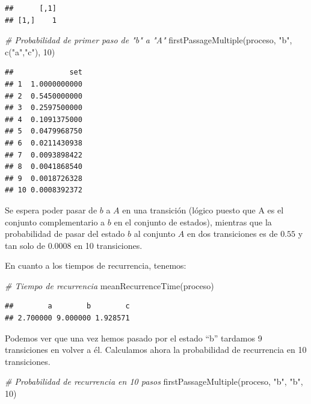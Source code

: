 \documentclass[
]{book}
\newenvironment{Shaded}{\begin{snugshade}}{\end{snugshade}}
\newcommand{\CommentTok}[1]{\textcolor[rgb]{0.56,0.35,0.01}{\textit{#1}}}
\newcommand{\DecValTok}[1]{\textcolor[rgb]{0.00,0.00,0.81}{#1}}
\newcommand{\FunctionTok}[1]{\textcolor[rgb]{0.00,0.00,0.00}{#1}}
\newcommand{\NormalTok}[1]{#1}
\newcommand{\StringTok}[1]{\textcolor[rgb]{0.31,0.60,0.02}{#1}}
\theoremstyle{definition}
\theoremstyle{definition}
\theoremstyle{definition}
\theoremstyle{definition}
\theoremstyle{remark}
\begin{document}
\begin{verbatim}
##      [,1]
## [1,]    1
\end{verbatim}

\begin{Shaded}
\begin{Highlighting}[]
\CommentTok{\# Probabilidad de primer paso de "b" a "A"}
\FunctionTok{firstPassageMultiple}\NormalTok{(proceso, }\StringTok{"b"}\NormalTok{, }\FunctionTok{c}\NormalTok{(}\StringTok{"a"}\NormalTok{,}\StringTok{"c"}\NormalTok{), }\DecValTok{10}\NormalTok{)}
\end{Highlighting}
\end{Shaded}

\begin{verbatim}
##             set
## 1  1.0000000000
## 2  0.5450000000
## 3  0.2597500000
## 4  0.1091375000
## 5  0.0479968750
## 6  0.0211430938
## 7  0.0093898422
## 8  0.0041868540
## 9  0.0018726328
## 10 0.0008392372
\end{verbatim}

Se espera poder pasar de \(b\) a \(A\) en una transición (lógico puesto que A es el conjunto complementario a \(b\) en el conjunto de estados), mientras que la probabilidad de pasar del estado \(b\) al conjunto \(A\) en dos transiciones es de \(0.55\) y tan solo de \(0.0008\) en 10 transiciones.

En cuanto a los tiempos de recurrencia, tenemos:

\begin{Shaded}
\begin{Highlighting}[]
\CommentTok{\# Tiempo de recurrencia}
\FunctionTok{meanRecurrenceTime}\NormalTok{(proceso)}
\end{Highlighting}
\end{Shaded}

\begin{verbatim}
##        a        b        c 
## 2.700000 9.000000 1.928571
\end{verbatim}

Podemos ver que una vez hemos pasado por el estado ``b'' tardamos 9 transiciones en volver a él. Calculamos ahora la probabilidad de recurrencia en 10 transiciones.

\begin{Shaded}
\begin{Highlighting}[]
\CommentTok{\# Probabilidad de recurrencia en 10 pasos}
\FunctionTok{firstPassageMultiple}\NormalTok{(proceso, }\StringTok{"b"}\NormalTok{, }\StringTok{"b"}\NormalTok{, }\DecValTok{10}\NormalTok{)}
\end{Highlighting}
\end{Shaded}
\end{document}
